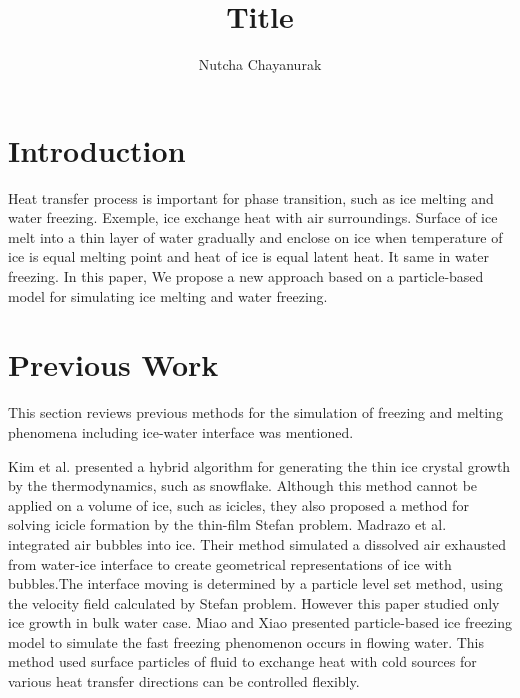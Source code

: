 \documentclass[10pt, twocolumn] {IEEEtran}
\begin{document}
\title{Title}
\author{Nutcha Chayanurak}
\maketitle
\begin{abstract} 
 \end{abstract}
\section{Introduction}
Heat transfer process is important for phase transition, such as ice melting and water freezing. Exemple, ice exchange heat with air surroundings. Surface of ice melt into a thin layer of water  gradually and enclose on ice when temperature of ice is equal melting point and heat of ice is equal latent heat. It same in water freezing. In this paper, We propose a new approach based on
a particle-based model for simulating ice melting and water freezing.
\section{Previous Work}
This section reviews previous methods for the simulation of freezing and melting phenomena including ice-water interface was mentioned. 

Kim et al.\cite{kim2004hybrid} presented a hybrid algorithm for generating the thin ice crystal growth by the thermodynamics, such as snowflake. Although this method cannot be applied on a volume of ice, such as icicles, they also proposed a method for solving icicle formation by the thin-film Stefan problem\cite{kim2006modeling}. Madrazo et al. integrated air bubbles into ice\cite{madrazo2009air}. Their method simulated a dissolved air exhausted from water-ice interface to create geometrical representations of ice with bubbles.The interface moving is determined by a particle level set method, using the velocity field calculated by Stefan problem. However this paper studied only ice growth in bulk water case. Miao and Xiao\cite{Miao:2015:PIF:2817675.2817676} presented particle-based ice freezing model to simulate the fast freezing phenomenon occurs in flowing water. This method used surface particles of fluid to exchange heat with cold sources for various heat transfer directions can be controlled flexibly.
 
\end{document}
